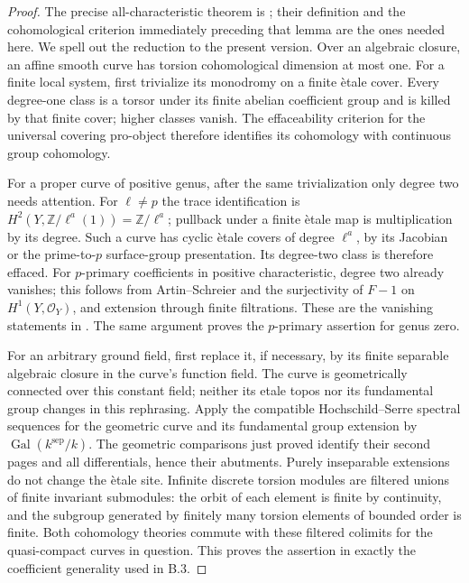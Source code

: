 \begin{proof}
The precise all-characteristic theorem is
\citet[Lemma 2.7(a)]{SchmidtStix2016}; their definition and the
cohomological criterion immediately preceding that lemma are the
ones needed here. We spell out the reduction to the present version.
Over an algebraic closure, an affine smooth curve has torsion
cohomological dimension at most one. For a finite local system,
first trivialize its monodromy on a finite \`etale cover. Every
degree-one class is a torsor under its finite abelian coefficient
group and is killed by that finite cover; higher classes vanish.
The effaceability criterion for the universal covering pro-object
therefore identifies its cohomology with continuous group cohomology.

For a proper curve of positive genus, after the same trivialization
only degree two needs attention. For $\ell\ne p$ the trace
identification is $H^2(Y,\mathbb Z/\ell^a(1))=\mathbb Z/\ell^a$;
pullback under a finite \`etale map is multiplication by its degree.
Such a curve has cyclic \`etale covers of degree $\ell^a$, by its
Jacobian or the prime-to-$p$ surface-group presentation. Its degree-two
class is therefore effaced. For $p$-primary coefficients in positive
characteristic, degree two already vanishes; this follows from
Artin--Schreier and the surjectivity of $F-1$ on $H^1(Y,\mathcal O_Y)$,
and extension through finite filtrations. These are the vanishing
statements in \citep[Tags 0A3J and 03SB]{StacksAS,StacksCurves}.
The same argument proves the $p$-primary assertion for genus zero.

For an arbitrary ground field, first replace it, if necessary, by
its finite separable algebraic closure in the curve's function field.
The curve is geometrically connected over this constant field;
neither its etale topos nor its fundamental group changes in this
rephrasing. Apply the compatible
Hochschild--Serre spectral sequences for the geometric curve and its
fundamental group extension by $\operatorname{Gal}(k^{\mathrm{sep}}/k)$.
The geometric comparisons just proved identify their second pages
and all differentials, hence their abutments. Purely inseparable
extensions do not change the \`etale site. Infinite discrete torsion
modules are filtered unions of finite invariant submodules: the orbit
of each element is finite by continuity, and the subgroup generated
by finitely many torsion elements of bounded order is finite.
Both cohomology theories commute with these filtered colimits for
the quasi-compact curves in question. This proves the assertion in
exactly the coefficient generality used in B.3.
\end{proof}

